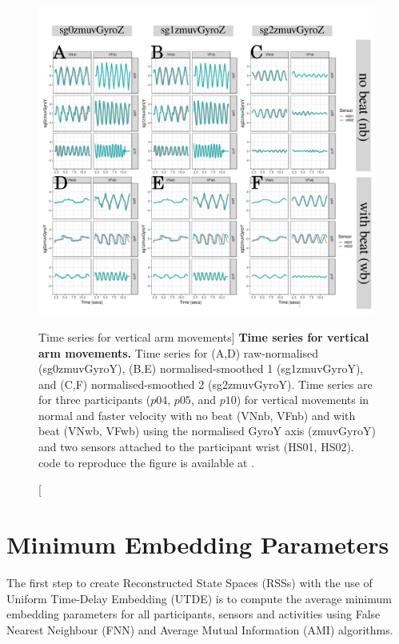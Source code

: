 \begin{figure}
\centering
\includegraphics[width=0.99\textwidth]{fig_5_02}
    	\caption
	[Time series for vertical arm movements]{
	{\bf Time series for vertical arm movements.}
		Time series for (A,D) raw-normalised (sg0zmuvGyroY), 
		(B,E) normalised-smoothed 1 (sg1zmuvGyroY), and
		(C,F) normalised-smoothed 2 (sg2zmuvGyroY).
		Time series are for three participants 
		($p04$, $p05$, and $p10$) 
		for vertical movements in normal and faster velocity with
		no beat	(VNnb, VFnb) and with beat (VNwb, VFwb) using the 
		normalised GyroY axis (zmuvGyroY) and two sensors 
		attached to the participant wrist (HS01, HS02).
	\R code to reproduce the figure is available at 
	.
        }
    \label{fig:tsV-hii}
\end{figure}

\newpage
\section{Minimum Embedding Parameters} \label{mep-hii}
The first step to create Reconstructed State Spaces (RSSs) with the use of
Uniform Time-Delay Embedding (UTDE) is to compute the
average minimum embedding parameters for all participants, sensors and 
activities using False Nearest Neighbour (FNN) and 
Average Mutual Information (AMI) algorithms.

